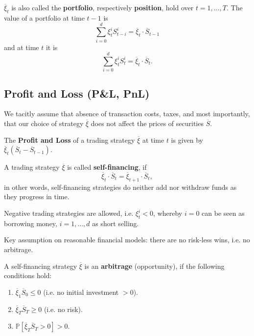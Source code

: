 \begin{rem}
$\overline \xi_t$ is also called the \textbf{portfolio}, respectively \textbf{position}, hold over $t=1,\ldots, T$. The value of a portfolio at time $t-1$ is 
$$\sum_{i=0}^d \xi_t^i S_{t-i}^i = \overline \xi_t\cdot \overline S_{t-1}$$
and at time $t$ it is
$$\sum_{i=0}^d \xi_t^i S_{t}^i = \overline \xi_t\cdot \overline S_{t}.$$
\end{rem}

\subsection{Profit and Loss (P\&L, PnL)}

\begin{rem}
We tacitly assume that absence of transaction costs, taxes, and most importantly, that our choice of strategy $\overline \xi$ does not affect the prices of securities $\overline S$.
\end{rem}

\begin{defi}
The \textbf{Profit and Loss} of a trading strategy $\overline \xi$ at time $t$ is given by $\overline \xi_t(\overline S_t-\overline S_{t-1})$.
\end{defi}

\begin{defi}
A trading strategy $\overline \xi$ is called \textbf{self-financing}, if 
$$\overline\xi_t\cdot \overline S_t = \overline \xi_{t+1}\cdot \overline S_t,$$
in other words, self-financing strategies do neither add nor withdraw funds as they progress in time.
\end{defi}

\begin{rem}
Negative trading strategies are allowed, i.e. $\xi_t^i<0$, whereby $i=0$ can be seen as borrowing money, $i=1,\ldots, d$ as short selling.
\end{rem}

\begin{rem}
Key assumption on reasonable financial models: there are no risk-less wins, i.e. no arbitrage.
\end{rem}

\begin{defi}
A self-financing strategy $\overline \xi$ is an \textbf{arbitrage} (opportunity), if the following conditions hold:
\begin{enumerate}
    \item $\overline \xi_1 \overline S_0\leq 0$ (i.e. no initial investment $>0$).
    \item $\overline \xi_T \overline S_T\geq 0$ (i.e. no risk).
    \item $\mathbb P[\overline \xi_T \overline S_T>0] >0$.
\end{enumerate}
\end{defi}


